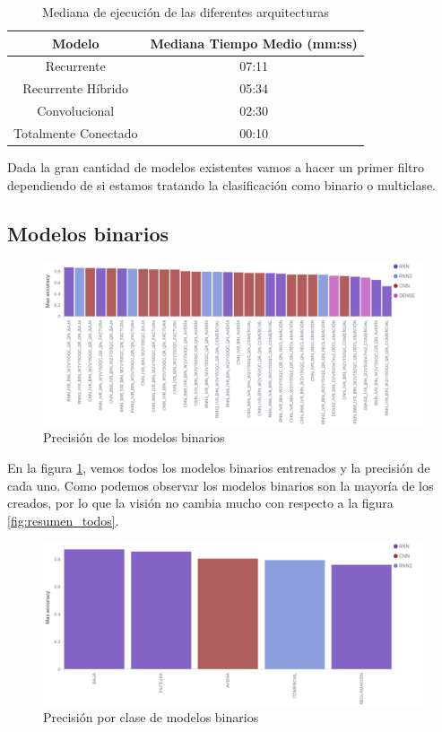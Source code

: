 \begin{table} 
\label{tbl:resumen_tiempo}
\centering
\begin{tabular}{|c|c|}
\hline 
\textbf{Modelo} &\textbf{ Mediana Tiempo Medio (mm:ss)} \\ 
\hline 
 Recurrente &   07:11 \\ 
\hline 
Recurrente Híbrido &  05:34 \\ 
\hline 
 Convolucional &  02:30 \\ 
\hline 
 Totalmente Conectado &  00:10\\ 
\hline 
\end{tabular}
\caption{Mediana de ejecución de las diferentes arquitecturas} 
\end{table}

Dada la gran cantidad de modelos existentes vamos a hacer un primer filtro dependiendo de si estamos tratando la clasificación como binario o multiclase.

 
\subsection{Modelos binarios}


\begin{figure}[!ht]
	\centering
	\includegraphics[width=1\textwidth]{images/super/resumen_bin}
	\caption{Precisión de los modelos binarios}
	\label{fig:resumen_bin}
\end{figure}

En la figura \ref{fig:resumen_bin}, vemos todos los modelos binarios entrenados y la precisión de cada uno. Como podemos observar los modelos binarios son la mayoría de los creados, por lo que la visión no cambia mucho con respecto a la figura \ref{fig:resumen_todos}.

\begin{figure}[!ht]
	\centering
	\includegraphics[width=1\textwidth]{images/super/resumen_bestbin}
	\caption{Precisión por clase de modelos binarios}
	\label{fig:resumen_bestbin}
\end{figure}

